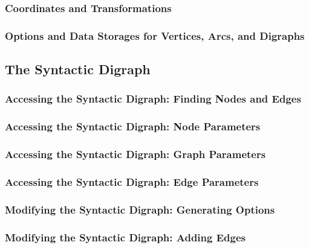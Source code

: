 \subsubsection{Coordinates and Transformations}


\subsubsection{Options and Data Storages for Vertices, Arcs, and Digraphs}



\subsection{The Syntactic Digraph}

\label{section-gd-syntactic-digraph}


\subsubsection{Accessing the Syntactic Digraph: Finding Nodes and Edges}

\subsubsection{Accessing the Syntactic Digraph: Node Parameters}

\subsubsection{Accessing the Syntactic Digraph: Graph Parameters}

\subsubsection{Accessing the Syntactic Digraph: Edge Parameters}

\subsubsection{Modifying the Syntactic Digraph: Generating Options}

\subsubsection{Modifying the Syntactic Digraph: Adding Edges}

